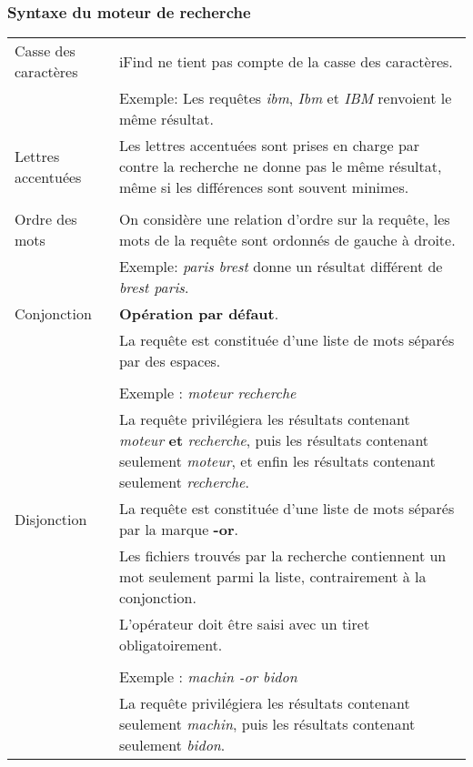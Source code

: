 \subsubsection{Syntaxe du moteur de recherche}

\begin{longtable}{| p{3.5cm} | p{9cm} |}

\hline
Casse des caractères & iFind ne tient pas compte de la casse des caractères.\\
& Exemple: Les requêtes \textit{ibm}, \textit{Ibm} et \textit{IBM} renvoient le même résultat.\\

\hline
Lettres accentuées & Les lettres accentuées sont prises en charge par contre la recherche ne donne pas le même résultat, même si les différences
sont souvent minimes.\\
& \\

\hline
Ordre des mots & On considère une relation d'ordre sur la requête, les mots de la requête sont ordonnés de gauche à droite.\\
& Exemple: \textit{paris brest} donne un résultat différent de \textit{brest paris}.\\

\hline
Conjonction & \textbf{Opération par défaut}.\\
& La requête est constituée d'une liste de mots séparés par des espaces.\\
& \\
& Exemple : \textit{moteur recherche}\\
& La requête privilégiera les résultats 
contenant \textit{moteur} \textbf{et} \textit{recherche}, 
puis les résultats contenant seulement \textit{moteur},
et enfin les résultats contenant seulement \textit{recherche}.\\

\hline
Disjonction & La requête est constituée d'une liste de mots séparés par la marque \textbf{-or}.\\
& Les fichiers trouvés par la recherche contiennent un mot seulement parmi la liste,
contrairement à la conjonction.\\
& L'opérateur doit être saisi avec un tiret obligatoirement.\\
& \\
& Exemple : \textit{machin -or bidon}\\
& La requête privilégiera les résultats contenant seulement \textit{machin},
puis les résultats contenant seulement \textit{bidon}.\\


\end{longtable}
